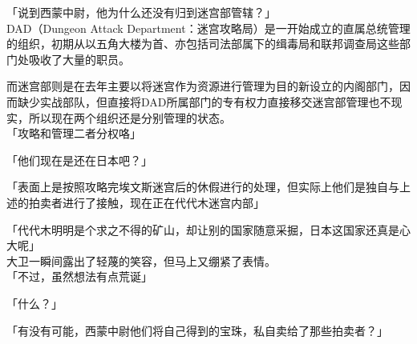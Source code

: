 「说到西蒙中尉，他为什么还没有归到迷宫部管辖？」\\

DAD（Dungeon Attack Department：迷宫攻略局）是一开始成立的直属总统管理的组织，初期从以五角大楼为首、亦包括司法部属下的缉毒局和联邦调查局这些部门处吸收了大量的职员。

而迷宫部则是在去年主要以将迷宫作为资源进行管理为目的新设立的内阁部门，因而缺少实战部队，但直接将DAD所属部门的专有权力直接移交迷宫部管理也不现实，所以现在两个组织还是分别管理的状态。\\

「攻略和管理二者分权咯」

「他们现在是还在日本吧？」

「表面上是按照攻略完埃文斯迷宫后的休假进行的处理，但实际上他们是独自与上述的拍卖者进行了接触，现在正在代代木迷宫内部」

「代代木明明是个求之不得的矿山，却让别的国家随意采掘，日本这国家还真是心大呢」\\

大卫一瞬间露出了轻蔑的笑容，但马上又绷紧了表情。\\

「不过，虽然想法有点荒诞」

「什么？」

「有没有可能，西蒙中尉他们将自己得到的宝珠，私自卖给了那些拍卖者？」\\

